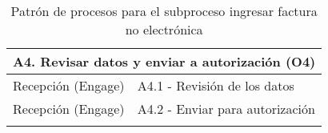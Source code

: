 \begin{longtable}{|llrrrrrr|}
    \multicolumn{8}{|l|}{\textbf{A4. Revisar datos y enviar a autorización  (O4) }} \\ \hline
    Recepción (Engage) & \multicolumn{7}{|m{12cm}|}{A4.1 - Revisión de los datos} \\ \hline
    Recepción (Engage) & \multicolumn{7}{|m{12cm}|}{A4.2 - Enviar para autorización} \\ \hline 
    \caption{Patrón de procesos para el subproceso ingresar factura no electrónica}
\end{longtable}